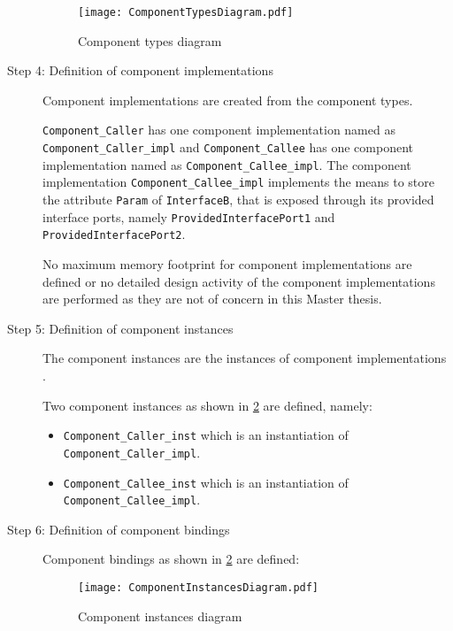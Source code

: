 \begin{description}
\begin{figure}[h]
	\centering
	\texttt{[image: ComponentTypesDiagram.pdf]}
	\caption{Component types diagram}
	\label{fig: Ex. Component types}
\end{figure}

\item [Step 4: Definition of component implementations] Component implementations are created from the component types.

\texttt{Component\allowbreak\_Caller} has one component implementation named as \texttt{Component\allowbreak\_Caller\_impl} and \texttt{Component\allowbreak\_Callee} has one component implementation named as \texttt{Component\allowbreak\_Callee\_impl}. The component implementation \texttt{Component\allowbreak\_Callee\_impl} implements the means to store the attribute \texttt{Param} of \texttt{InterfaceB}, that is exposed through its provided interface ports, namely \texttt{Provided\allowbreak Interface\allowbreak Port1} and \texttt{Provided\allowbreak Interface\allowbreak Port2}.

No maximum memory footprint for component implementations are defined or no detailed design activity of the component implementations are performed as they are not of concern in this Master thesis.

\item [Step 5: Definition of component instances] The component instances are the instances of component implementations \cite{CompBasedProcess}.

Two component instances as shown in \cref{fig: Ex. Component instances} are defined, namely:
\begin{itemize}
\item \texttt{Component\allowbreak\_Caller\_inst} which is an instantiation of \texttt{Component\allowbreak\_Caller\_impl}.
\item \texttt{Component\allowbreak\_Callee\_inst} which is an instantiation of \texttt{Component\allowbreak\_Callee\_impl}.
\end{itemize}

\item [Step 6: Definition of component bindings] Component bindings as shown in \cref{fig: Ex. Component instances} are defined:

\begin{figure}[h]
	\centering
	\texttt{[image: ComponentInstancesDiagram.pdf]}
	\caption{Component instances diagram}
	\label{fig: Ex. Component instances}
\end{figure}


\end{description}
